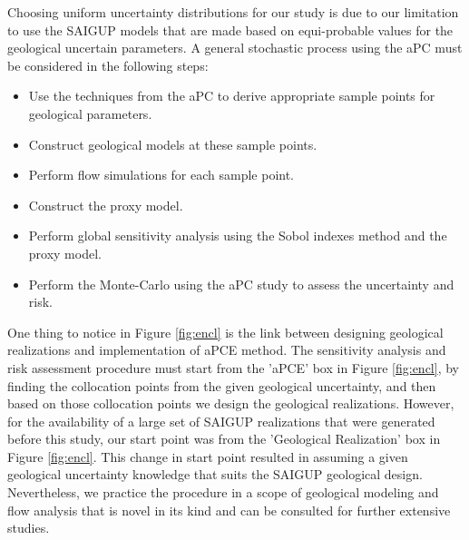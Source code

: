 Choosing uniform uncertainty distributions for our study is due to our limitation to use the SAIGUP models that are made based on equi-probable values for the geological uncertain parameters. A general stochastic process using the aPC must be considered in the following steps:

\begin{itemize}
\item Use the techniques from the aPC to derive appropriate sample points
    for geological parameters.
\item Construct geological models at these sample points.
\item Perform flow simulations for each sample point.
\item Construct the proxy model.
\item Perform global sensitivity analysis using the Sobol indexes method and the proxy model. 
\item Perform the Monte-Carlo using the aPC study to assess the uncertainty and risk.
\end{itemize}

One thing to notice in Figure  \ref{fig:encl} is the link between designing
geological realizations and implementation of aPCE method. The sensitivity analysis and risk assessment procedure
must start from the 'aPCE' box in Figure  \ref{fig:encl}, by finding the collocation points from the given geological
uncertainty, and then based on those collocation points we design the
geological realizations. However, for the availability of a large set of SAIGUP realizations that were generated before this study, our start point was from the 'Geological Realization' box in Figure \ref{fig:encl}. This change in start point resulted in assuming a given geological uncertainty knowledge that suits the SAIGUP geological design. Nevertheless, we practice the procedure in a scope of geological modeling and flow analysis that is novel in its kind and can be consulted for further extensive studies.
